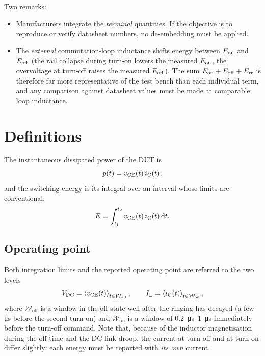 Two remarks:
\begin{itemize}
\item Manufacturers integrate the \emph{terminal} quantities. If the objective is to
reproduce or verify datasheet numbers, no de-embedding must be applied.
\item The \emph{external} commutation-loop inductance shifts energy between $E_{\mathrm{on}}$ and
$E_{\mathrm{off}}$ (the rail collapse during turn-on lowers the measured $E_{\mathrm{on}}$, the overvoltage at
turn-off raises the measured $E_{\mathrm{off}}$). The sum $E_{\mathrm{on}}+E_{\mathrm{off}}+E_{\mathrm{rr}}$ is therefore far more
representative of the test bench than each individual term, and any comparison against
datasheet values must be made at comparable loop inductance.
\end{itemize}

\section{Definitions}

The instantaneous dissipated power of the DUT is
\begin{equation}
p(t)=v_{\mathrm{CE}}(t)\,i_{\mathrm{C}}(t),
\end{equation}
and the switching energy is its integral over an interval whose limits are conventional:
\begin{equation}
E=\int_{t_1}^{t_2}v_{\mathrm{CE}}(t)\,i_{\mathrm{C}}(t)\,\mathrm{d}t .
\end{equation}

\subsection{Operating point}

Both integration limits and the reported operating point are referred to the two levels
\begin{equation}
V_{\mathrm{DC}} = \left\langle v_{\mathrm{CE}}(t)\right\rangle_{t\in\mathcal{W}_{\mathrm{off}}},
\qquad
I_{\mathrm{L}} = \left\langle i_{\mathrm{C}}(t)\right\rangle_{t\in\mathcal{W}_{\mathrm{on}}},
\end{equation}
where $\mathcal{W}_{\mathrm{off}}$ is a window in the off-state well after the ringing has
decayed (a few \si{\micro\second} before the second turn-on) and
$\mathcal{W}_{\mathrm{on}}$ is a window of \SIrange{0.2}{1}{\micro\second} immediately
before the turn-off command. Note that, because of the inductor magnetisation during the
off-time and the DC-link droop, the current at turn-off and at turn-on differ slightly:
each energy must be reported with \emph{its own} current.

